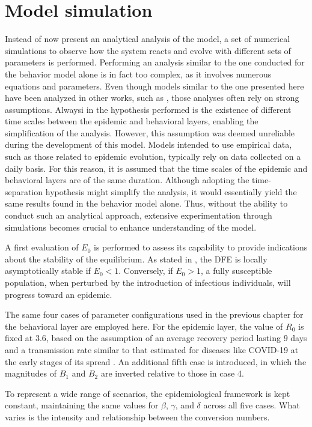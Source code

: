 \section{Model simulation}
Instead of now present an analytical analysis of the model, a set of numerical simulations to observe how the system reacts and evolve with different sets of parameters is performed.
Performing an analysis similar to the one conducted for the behavior model alone is in fact too complex, as it involves numerous equations and parameters. Even though models similar to the one presented here have been analyzed in other works, such as \cite{Bulai2023}, those analyses often rely on strong assumptions. Alwaysi in \cite{Bulai2023} the hypothesis performed is the existence of different time scales between the epidemic and behavioral layers, enabling the simplification of the analysis. However, this assumption was deemed unreliable during the development of this model. Models intended to use empirical data, such as those related to epidemic evolution, typically rely on data collected on a daily basis. For this reason, it is assumed that the time scales of the epidemic and behavioral layers are of the same duration. Although adopting the time-separation hypothesis might simplify the analysis, it would essentially yield the same results found in the behavior model alone. Thus, without the ability to conduct such an analytical approach, extensive experimentation through simulations becomes crucial to enhance understanding of the model.

A first evaluation of $E_0$ is performed to assess its capability to provide indications about the stability of the equilibrium. As stated in \cite{van_den_Driessche_2002,van_den_Driessche_2017}, the DFE is locally asymptotically stable if $E_0 < 1$. Conversely, if $E_0 > 1$, a fully susceptible population, when perturbed by the introduction of infectious individuals, will progress toward an epidemic.

The same four cases of parameter configurations used in the previous chapter for the behavioral layer are employed here. For the epidemic layer, the value of $R_0$ is fixed at $3.6$, based on the assumption of an average recovery period lasting $9$ days and a transmission rate similar to that estimated for diseases like COVID-19 at the early stages of its spread \cite{data_R0_covid}. An additional fifth case is introduced, in which the magnitudes of $B_1$ and $B_2$ are inverted relative to those in case 4.

To represent a wide range of scenarios, the epidemiological framework is kept constant, maintaining the same values for $\beta$, $\gamma$, and $\delta$ across all five cases. What varies is the intensity and relationship between the conversion numbers.

